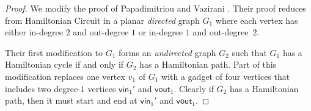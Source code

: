 \documentclass[11pt,letterpaper]{article}
\theoremstyle{plain}
\theoremstyle{definition}
\theoremstyle{remark}
\numberwithin{equation}{section}
\begin{document}
\begin{proof}
  We modify the proof of Papadimitriou and Vazirani \cite{Degree3GridHamPath}.
  Their proof reduces from Hamiltonian Circuit in
  a planar \emph{directed} graph $G_1$ where each vertex has
  either in-degree $2$ and out-degree $1$ or in-degree $1$ and out-degree~$2$.

  Their first modification to $G_1$ \cite[Figure~2]{Degree3GridHamPath}
  forms an \emph{undirected} graph $G_2$ such that
  $G_1$ has a Hamiltonian cycle if and only if $G_2$ has a Hamiltonian path.
  Part of this modification \cite[Figure~2(b)]{Degree3GridHamPath}
  replaces one vertex $v_1$ of $G_1$ with a gadget of four vertices
  that includes two degree-$1$ vertices $\textsf{vin}_1'$ and
  $\textsf{vout}_1$.
  Clearly if $G_2$ has a Hamiltonian path, then it must start and end
  at $\textsf{vin}_1'$ and $\textsf{vout}_1$.


\end{proof}
\end{document}
